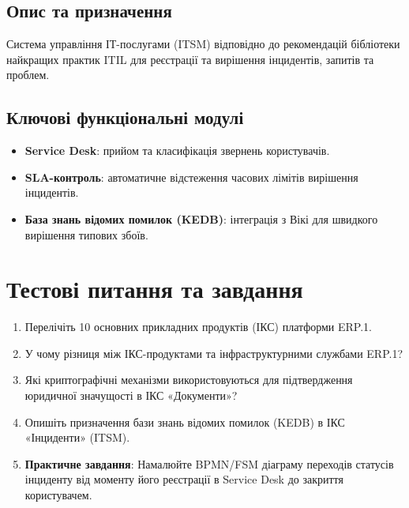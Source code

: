 \subsection{Опис та призначення}
Система управління ІТ-послугами (ITSM) відповідно до рекомендацій бібліотеки найкращих практик ITIL для реєстрації та вирішення інцидентів, запитів та проблем.
\subsection{Ключові функціональні модулі}
\begin{itemize}
    \item \textbf{Service Desk}: прийом та класифікація звернень користувачів.
    \item \textbf{SLA-контроль}: автоматичне відстеження часових лімітів вирішення інцидентів.
    \item \textbf{База знань відомих помилок (KEDB)}: інтеграція з Вікі для швидкого вирішення типових збоїв.
\end{itemize}

\section{Тестові питання та завдання}
\begin{enumerate}
    \item Перелічіть 10 основних прикладних продуктів (ІКС) платформи ERP.1.
    \item У чому різниця між ІКС-продуктами та інфраструктурними службами ERP.1?
    \item Які криптографічні механізми використовуються для підтвердження юридичної значущості в ІКС «Документи»?
    \item Опишіть призначення бази знань відомих помилок (KEDB) в ІКС «Інциденти» (ITSM).
    \item \textbf{Практичне завдання}: Намалюйте BPMN/FSM діаграму переходів статусів інциденту від моменту його реєстрації в Service Desk до закриття користувачем.
\end{enumerate}

